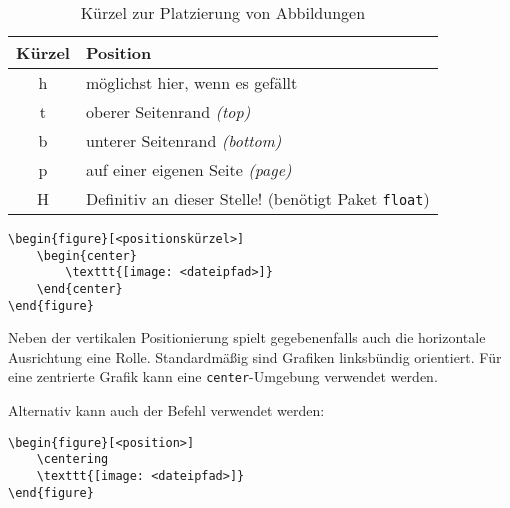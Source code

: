 \begin{table}[h!]
	\center
	\begin{tabular}{cl}
		\toprule
		Kürzel & Position                              \\
		\midrule
		h      & möglichst hier, wenn es gefällt           \\
		t      & oberer Seitenrand \emph{(top)}        \\
		b      & unterer Seitenrand \emph{(bottom)}    \\
		p      & auf einer eigenen Seite \emph{(page)} \\
		H      & Definitiv an dieser Stelle! (benötigt Paket \texttt{float}) \\
		\bottomrule
	\end{tabular}
	\caption{Kürzel zur Platzierung von Abbildungen}
	\label{tbl:positionskuerzel}
\end{table}

\begin{verbatim}
\begin{figure}[<positionskürzel>]
	\begin{center}
		\texttt{[image: <dateipfad>]}
	\end{center}
\end{figure}
\end{verbatim}

Neben der vertikalen Positionierung spielt gegebenenfalls auch die horizontale Ausrichtung eine Rolle. Standardmäßig sind Grafiken linksbündig orientiert. Für eine zentrierte Grafik kann eine \texttt{center}-Umgebung verwendet werden.

\noindent Alternativ kann auch der Befehl \texttt{\centering} verwendet werden:

\begin{verbatim}
\begin{figure}[<position>]
	\centering
	\texttt{[image: <dateipfad>]}
\end{figure}
\end{verbatim}


